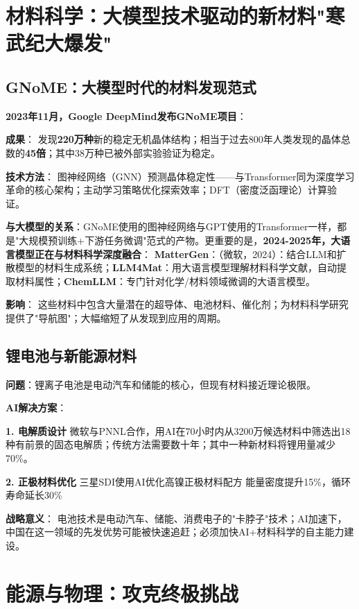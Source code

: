 \section{材料科学：大模型技术驱动的新材料"寒武纪大爆发"}

\subsection{GNoME：大模型时代的材料发现范式}

\textbf{2023年11月，Google DeepMind发布GNoME项目}\cite{merchant2023scaling}：

\textbf{成果}：
发现\textbf{220万种}新的稳定无机晶体结构；相当于过去800年人类发现的晶体总数的\textbf{45倍}；其中38万种已被外部实验验证为稳定。

\textbf{技术方法}：
图神经网络（GNN）预测晶体稳定性——与Transformer同为深度学习革命的核心架构；主动学习策略优化探索效率；DFT（密度泛函理论）计算验证。

\textbf{与大模型的关系}：GNoME使用的图神经网络与GPT使用的Transformer一样，都是"大规模预训练+下游任务微调"范式的产物。更重要的是，\textbf{2024-2025年，大语言模型正在与材料科学深度融合}：
\textbf{MatterGen}：（微软，2024）：结合LLM和扩散模型的材料生成系统；\textbf{LLM4Mat}：用大语言模型理解材料科学文献，自动提取材料属性；\textbf{ChemLLM}：专门针对化学/材料领域微调的大语言模型。

\textbf{影响}：
这些材料中包含大量潜在的超导体、电池材料、催化剂；为材料科学研究提供了"导航图"；大幅缩短了从发现到应用的周期。

\subsection{锂电池与新能源材料}

\textbf{问题}：锂离子电池是电动汽车和储能的核心，但现有材料接近理论极限。

\textbf{AI解决方案}：

\textbf{1. 电解质设计}
微软与PNNL合作，用AI在70小时内从3200万候选材料中筛选出18种有前景的固态电解质；传统方法需要数十年；其中一种新材料将锂用量减少70\%。

\textbf{2. 正极材料优化}
三星SDI使用AI优化高镍正极材料配方 能量密度提升15\%，循环寿命延长30\%

\textbf{战略意义}：
电池技术是电动汽车、储能、消费电子的"卡脖子"技术；AI加速下，中国在这一领域的先发优势可能被快速追赶；必须加快AI+材料科学的自主能力建设。

\section{能源与物理：攻克终极挑战}

